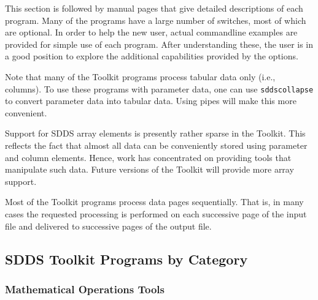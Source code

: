 \documentclass[11pt]{article}
\begin{document}
This section is followed by manual pages that give detailed
descriptions of each program.  Many of the programs have a large
number of switches, most of which are optional.  In order to help the
new user, actual commandline examples are provided for simple use of
each program.  After understanding these, the user is in a good
position to explore the additional capabilities provided by the
options.

Note that many of the Toolkit programs process tabular data only
(i.e., columns).  To use these programs with parameter data, one can
use {\tt sddscollapse} to convert parameter data into tabular data.
Using pipes will make this more convenient.

Support for SDDS array elements is presently rather sparse in the
Toolkit.  This reflects the fact that almost all data can be
conveniently stored using parameter and column elements.  Hence, work
has concentrated on providing tools that manipulate such data.  Future
versions of the Toolkit will provide more array support.

Most of the Toolkit programs process data pages sequentially.  That
is, in many cases the requested processing is performed on each
successive page of the input file and delivered to successive pages of
the output file.

\subsection{SDDS Toolkit Programs by Category}

\subsubsection{ Mathematical Operations Tools}
\end{document}
